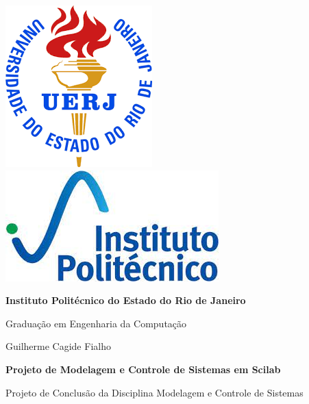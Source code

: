 \begin{titlepage}
    \centering

    \includegraphics[height=0.151\textwidth]{header/contra-capa/assets/uerj.png}\hfill
    \includegraphics[height=0.15\textwidth]{header/contra-capa/assets/iprj.jpeg}\hfill

    \vspace{2cm} %

    {\Large\bfseries Instituto Politécnico do Estado do Rio de Janeiro \par}
    \vspace{0.5cm}
    {\large Graduação em Engenharia da Computação \par}

    \vspace{3cm} %

    {\large Guilherme Cagide Fialho \par}

    \vspace{1.5cm}

    {\large\bfseries Projeto de Modelagem e Controle de Sistemas em Scilab \par}

    \vspace{1cm} %

    \begin{flushright}
        \begin{minipage}{0.5\textwidth}
            \large
            \raggedleft %
            Projeto de Conclusão da Disciplina Modelagem e Controle de Sistemas
        \end{minipage}
    \end{flushright}


\end{titlepage}
